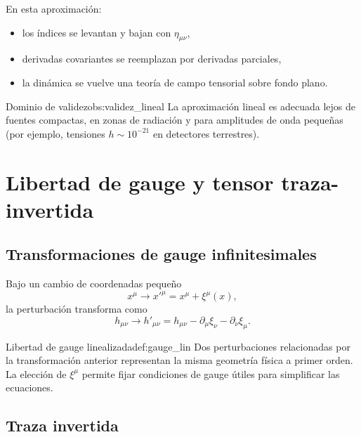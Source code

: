 En esta aproximación:
\begin{itemize}[leftmargin=2em]
  \item los índices se levantan y bajan con $\eta_{\mu\nu}$,
  \item derivadas covariantes se reemplazan por derivadas parciales,
  \item la dinámica se vuelve una teoría de campo tensorial sobre fondo plano.
\end{itemize}

\begin{observacion}{Dominio de validez}{obs:validez_lineal}
La aproximación lineal es adecuada lejos de fuentes compactas, en zonas de radiación y para amplitudes de onda pequeñas (por ejemplo, tensiones $h\sim10^{-21}$ en detectores terrestres).
\end{observacion}

\section{Libertad de gauge y tensor traza-invertida}
\label{sec:gauge_lorenz}

\subsection{Transformaciones de gauge infinitesimales}

Bajo un cambio de coordenadas pequeño
\begin{equation}
  x^{\mu}\to x'^{\mu}=x^{\mu}+\xi^{\mu}(x),
\end{equation}
la perturbación transforma como
\begin{equation}
  h_{\mu\nu}\to h'_{\mu\nu}=h_{\mu\nu}-\partial_{\mu}\xi_{\nu}-\partial_{\nu}\xi_{\mu}.
\end{equation}

\begin{definicion}{Libertad de gauge linealizada}{def:gauge_lin}
Dos perturbaciones relacionadas por la transformación anterior representan la misma geometría física a primer orden. La elección de $\xi^\mu$ permite fijar condiciones de gauge útiles para simplificar las ecuaciones.
\end{definicion}

\subsection{Traza invertida}

